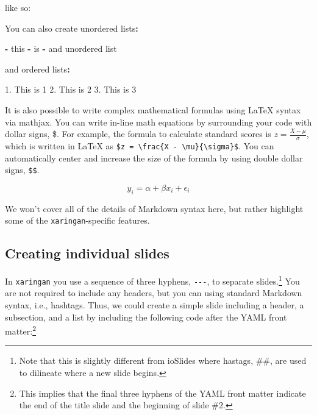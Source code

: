 \documentclass[
]{book}
\newenvironment{Shaded}{\begin{snugshade}}{\end{snugshade}}
\newcommand{\DecValTok}[1]{\textcolor[rgb]{0.06,0.06,0.06}{#1}}
\newcommand{\FloatTok}[1]{\textcolor[rgb]{0.06,0.06,0.06}{#1}}
\newcommand{\NormalTok}[1]{#1}
\newcommand{\OperatorTok}[1]{\textcolor[rgb]{0.43,0.43,0.43}{\textbf{#1}}}
\newcommand{\StringTok}[1]{\textcolor[rgb]{0.5,0.5,0.5}{#1}}
\begin{document}
like so:

\begin{Shaded}
\begin{Highlighting}[]
\NormalTok{You can also create unordered lists}\OperatorTok{:}\StringTok{ }

\OperatorTok{-}\StringTok{ }\NormalTok{this }
\OperatorTok{-}\StringTok{ }\NormalTok{is }
\OperatorTok{-}\StringTok{ }\NormalTok{and unordered list}

\NormalTok{and ordered lists}\OperatorTok{:}\StringTok{ }

\FloatTok{1.}\NormalTok{ This is }\DecValTok{1}
\FloatTok{2.}\NormalTok{ This is }\DecValTok{2}
\FloatTok{3.}\NormalTok{ This is }\DecValTok{3}
\end{Highlighting}
\end{Shaded}

It is also possible to write complex mathematical formulas using LaTeX syntax via mathjax. You can write in-line math equations by surrounding your code with dollar signs, \$. For example, the formula to calculate standard scores is \(z = \frac{X - \mu}{\sigma}\), which is written in LaTeX as \texttt{\$z\ =\ \textbackslash{}frac\{X\ -\ \textbackslash{}mu\}\{\textbackslash{}sigma\}\$}. You can automatically center and increase the size of the formula by using double dollar signs, \texttt{\$\$}.

\[y_{i} = \alpha + \beta x_{i} + \epsilon_{i}\]

We won't cover all of the details of Markdown syntax here, but rather highlight some of the \texttt{xaringan}-specific features.

\hypertarget{creating-individual-slides}{%
\subsection{Creating individual slides}\label{creating-individual-slides}}

In \texttt{xaringan} you use a sequence of three hyphens, \texttt{-\/-\/-}, to separate slides.\footnote{Note that this is slightly different from ioSlides where hastags, \#\#, are used to dilineate where a new slide begins.} You are not required to include any headers, but you can using standard Markdown syntax, i.e., hashtags. Thus, we could create a simple slide including a header, a subsection, and a list by including the following code after the YAML front matter:\footnote{This implies that the final three hyphens of the YAML front matter indicate the end of the title slide and the beginning of slide \#2.}
\end{document}
